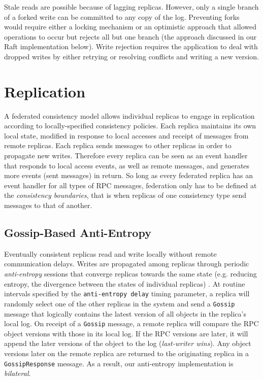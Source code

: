 \documentclass[10pt,conference,letterpaper]{IEEEtran}
\begin{document}
Stale reads are possible because of lagging replicas.
However, only a single branch of a forked write can be committed to any copy of the log.
Preventing forks would require either a locking mechanism or an optimistic approach that
allowed operations to occur but rejects all but one branch (the approach discussed in our
Raft implementation below).
Write rejection requires the application to deal with dropped writes by either retrying or
resolving conflicts and writing a new version.

\section{Replication}
\label{sec:replication}
A federated consistency model allows individual replicas to
engage in replication according to locally-specified consistency policies.
Each replica maintains its own local state, modified in response to local accesses
and receipt of messages from remote replicas.
Each replica sends messages to other replicas in order to propagate new writes.
Therefore every replica can be seen as an event handler that responds to local access
events, as well as remote messages, and generates more events (sent messages) in return.
So long as every federated replica has an event handler for all types of RPC
messages, federation only has to be defined at the \textit{consistency boundaries}, that
is when replicas of one consistency type send messages to that of another.


\subsection{Gossip-Based Anti-Entropy}

Eventually consistent replicas  read and write locally without remote communication delays.
Writes are propagated among replicas through
periodic \textit{anti-entropy} sessions that
converge replicas towards the same state (e.g.
reducing entropy, the divergence between the states of individual replicas)
\cite{kempe_gossip-based_2003}.
At routine intervals specified by the \texttt{anti-entropy delay} timing parameter, a
replica will randomly select one of the other replicas in the system and send a
\texttt{Gossip} message that logically contains the latest version of all objects in the replica's
local log.
On receipt of a \texttt{Gossip} message, a remote replica will compare the RPC object
versions with those in its local log.
If the RPC versions are later, it will append the later versions of the object to the log
(\textit{last-writer wins}).
Any object versions later on the remote replica are returned to the
originating replica in a \texttt{GossipResponse} message.
As a result, our anti-entropy implementation is \textit{bilateral}.
\end{document}
